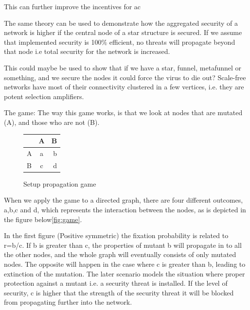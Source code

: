   
 
This can further improve the incentives for ac

The same theory can be used to demonstrate how the aggregated security of a network is higher if the central node of a star structure is secured. 
If we assume that implemented security is 100$\%$ efficient, no threats will propagate beyond that node i.e total security for the network is increased. 

 
This could maybe be used to show that if we have a star, funnel, metafunnel or something, and we secure the nodes it could force the virus to die out?
Scale-free networks have most of their connectivity clustered in a few vertices, i.e. they are potent selection amplifiers.

 
The game:
The way this game works, is that we look at nodes that are mutated (A), and those who are not (B).  
\begin{figure}
\centering 
\begin{tabular}{ l | c | r }
  
   & A & B \\  \hline  
  A & a & b \\ \hline  
  B & c & d \\
  
\end{tabular}
\caption{\label{fig:gamesetup} Setup propagation game \cite{lieberman2005evolutionary}}
\end{figure}

When we apply the game to a directed graph, there are four different outcomes, a,b,c and d, which represents the interaction between the nodes, as is depicted in the figure below\ref{fig:game}. 

In the first figure (Positive symmetric) the fixation probability is related to r=b/c. If b is greater than c, the properties of mutant b will propagate in to all the other nodes, and the whole graph will eventually consists of only mutated nodes. The opposite will happen in the case where c is greater than b, leading to extinction of the mutation. The later scenario models the situation where proper protection against a mutant i.e. a security threat is installed. If the level of security, c is higher that the strength of the security threat it will be blocked from propagating further into the network. 


